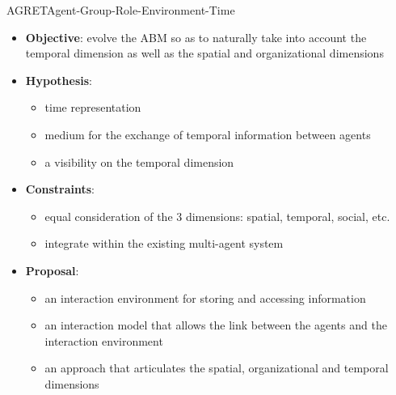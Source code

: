 \begin{frame}{AGRET}{Agent-Group-Role-Environment-Time}
\begin{itemize}
    \item \textbf{Objective}: evolve the ABM so as to naturally take into account the temporal dimension as well as the spatial and organizational dimensions
    \item \textbf{Hypothesis}: 
    \begin{itemize}
        \item time representation
        \item medium for the exchange of temporal information between agents
        \item a visibility on the temporal dimension
    \end{itemize}
    \item \textbf{Constraints}:
    \begin{itemize}
        \item equal consideration of the 3 dimensions: spatial, temporal, social, etc.
        \item integrate within the existing multi-agent system
    \end{itemize}
    \item \textbf{Proposal}:
    \begin{itemize}
        \item an interaction environment for storing and accessing information
        \item an interaction model that allows the link between the agents and the interaction environment
        \item an approach that articulates the spatial, organizational and temporal dimensions
    \end{itemize}
\end{itemize}


\end{frame}
